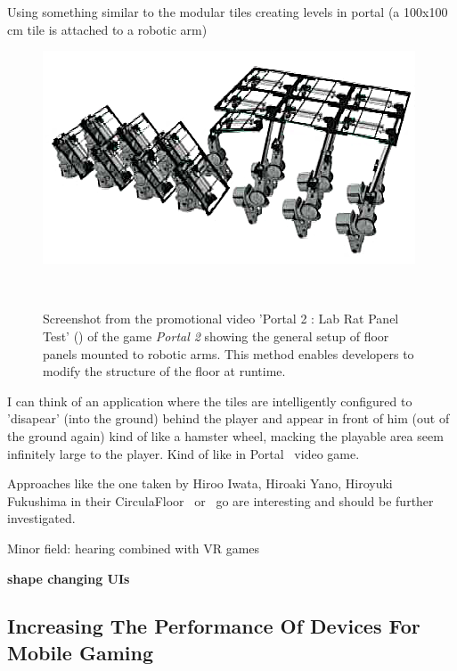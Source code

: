 Using something similar to the modular tiles creating levels in portal (a 100x100 cm tile is attached to a robotic arm)

\begin{figure}
	\centering
	\includegraphics[width=0.9\columnwidth]{./figures/portallabrattest}
	\caption[Portal 2 : Lab Rat Panel Test]{Screenshot from the promotional video 'Portal 2 : Lab Rat Panel Test' (\ccbyncsa) of the game \textit{Portal 2 \textregistered\textcopyright} showing the general setup of floor panels mounted to robotic arms. This method enables developers to modify the structure of the floor at runtime.\footnotemark}~\label{fig:portallabrattest}
\end{figure}

I can think of an application where the tiles are intelligently configured to 'disapear' (into the ground) behind the player and appear in front of him (out of the ground again) kind of like a hamster wheel, macking the playable area seem infinitely large to the player. Kind of like in Portal~\cite{game:portal} video game.

Approaches like the one taken by Hiroo Iwata, Hiroaki Yano, Hiroyuki Fukushima in their CirculaFloor~\cite{Iwata:2005:CLI:1078037.1079777} or~\cite{Souman:2010:MVW:1670671.1670675} go are interesting and should be further investigated. 

Minor field: hearing combined with VR games

\textbf{shape changing UIs}


\subsection{Increasing The Performance Of Devices For Mobile Gaming}
